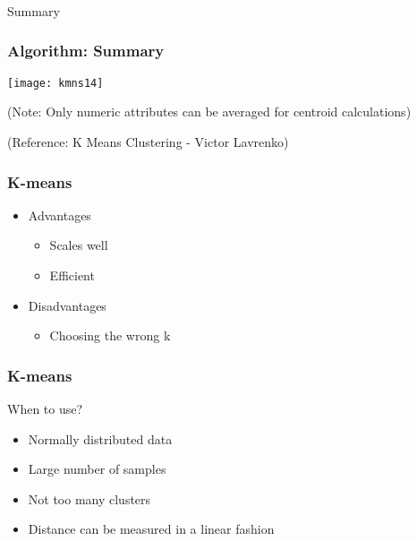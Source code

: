 \begin{frame}[fragile]\frametitle{}
\begin{center}
{\Large Summary}
\end{center}
\end{frame}

\begin{frame}[fragile]\frametitle{Algorithm: Summary}
\begin{center}
\texttt{[image: kmns14]}
\end{center}

(Note: Only numeric attributes can be averaged for centroid calculations)

\tiny{(Reference: K Means Clustering - Victor Lavrenko)}
\end{frame}


\begin{frame}[fragile]\frametitle{K-means}
\begin{itemize}
\item  Advantages
\begin{itemize}
\item  Scales well
\item   Efficient
\end{itemize}
\item  Disadvantages
\begin{itemize}
\item Choosing the wrong k
\end{itemize}
\end{itemize}
\end{frame}

\begin{frame}[fragile]\frametitle{K-means}
When to use?
\begin{itemize}
\item  Normally distributed data
\item  Large number of samples
\item  Not too many clusters
\item  Distance can be measured in a linear fashion
\end{itemize}
\end{frame}



